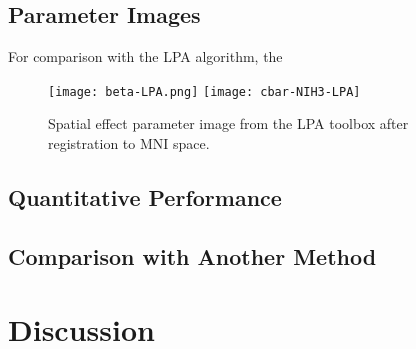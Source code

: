 \subsection{Parameter Images}\label{ss:paramimg}

For comparison with the LPA algorithm, the
\begin{figure}
  \centering\texttt{[image: beta-LPA.png]} \texttt{[image: cbar-NIH3-LPA]}
  \caption{Spatial effect parameter image from the LPA toolbox after registration to MNI space.}
  \label{fig:B-lpa}
\end{figure}

\subsection{Quantitative Performance}
\subsection{Comparison with Another Method}
\section{Discussion}



%
